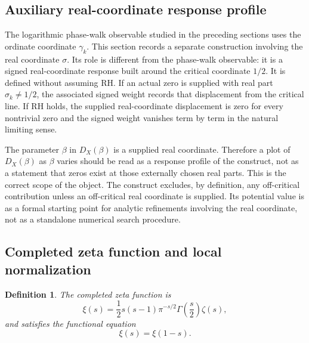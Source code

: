 \documentclass[12pt]{article}
\numberwithin{equation}{section}
\newtheorem{definition}[theorem]{Definition}
\begin{document}
\subsection{Auxiliary real-coordinate response profile}
\label{sec:counting_coordinate_response_profiles}

The logarithmic phase-walk observable studied in the preceding sections uses the ordinate coordinate \(\gamma_k\).  This section records a separate construction involving the real coordinate \(\sigma\).  Its role is different from the phase-walk observable: it is a signed real-coordinate response built around the critical coordinate \(1/2\).  It is defined without assuming RH.  If an actual zero is supplied with real part \(\sigma_k\neq1/2\), the associated signed weight records that displacement from the critical line.  If RH holds, the supplied real-coordinate displacement is zero for every nontrivial zero and the signed weight vanishes term by term in the natural limiting sense.


\noindent The parameter \(\beta\) in \(D_X(\beta)\) is a supplied real coordinate.  Therefore a plot of \(D_X(\beta)\) as \(\beta\) varies should be read as a response profile of the construct, not as a statement that zeros exist at those externally chosen real parts.  This is the correct scope of the object.  The construct excludes, by definition, any off-critical contribution unless an off-critical real coordinate is supplied.  Its potential value is as a formal starting point for analytic refinements involving the real coordinate, not as a standalone numerical search procedure.


\subsection{Completed zeta function and local normalization}
\label{subsec:completed_zeta_local_normalization}

\begin{definition}
\label{def:completed_zeta_xi}
The completed zeta function is
\begin{equation}
\xi(s)
=
\frac{1}{2}s(s-1)\pi^{-s/2}\Gamma\left(\frac{s}{2}\right)\zeta(s),
\label{eq:completed_zeta_xi}
\end{equation}
and satisfies the functional equation
\begin{equation}
\xi(s)=\xi(1-s).
\label{eq:completed_zeta_functional_equation}
\end{equation}
\end{definition}
\end{document}
